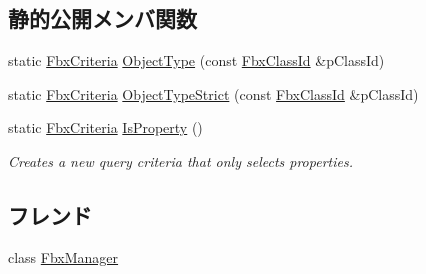 \subsection*{静的公開メンバ関数}
\begin{DoxyCompactItemize}
\item 
static \hyperlink{class_fbx_criteria}{Fbx\+Criteria} \hyperlink{class_fbx_criteria_a760d66022a8febcd3fd0c5fbbb534023}{Object\+Type} (const \hyperlink{class_fbx_class_id}{Fbx\+Class\+Id} \&p\+Class\+Id)
\item 
static \hyperlink{class_fbx_criteria}{Fbx\+Criteria} \hyperlink{class_fbx_criteria_a38bc13d95aaea852252625ca084054dd}{Object\+Type\+Strict} (const \hyperlink{class_fbx_class_id}{Fbx\+Class\+Id} \&p\+Class\+Id)
\item 
static \hyperlink{class_fbx_criteria}{Fbx\+Criteria} \hyperlink{class_fbx_criteria_abe944a4f8d41017f7043b4855f03d20e}{Is\+Property} ()
\begin{DoxyCompactList}\small\item\em Creates a new query criteria that only selects properties. \end{DoxyCompactList}\end{DoxyCompactItemize}
\subsection*{フレンド}
\begin{DoxyCompactItemize}
\item 
class \hyperlink{class_fbx_criteria_aa6292f0d09535e3fe957088d09276268}{Fbx\+Manager}
\end{DoxyCompactItemize}


